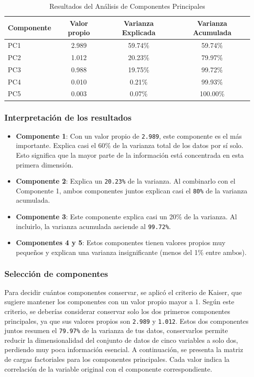 \documentclass[journal]{IEEEtran}
\begin{document}
	\begin{table}[H]
		\centering
		\caption{Resultados del Análisis de Componentes Principales}
		\begin{tabular}{l c c c}
			\toprule
			Componente & Valor propio & Varianza Explicada & Varianza Acumulada \\
			\midrule
			PC1 & 2.989 & 59.74\% & 59.74\% \\
			PC2 & 1.012 & 20.23\% & 79.97\% \\
			PC3 & 0.988 & 19.75\% & 99.72\% \\
			PC4 & 0.010 & 0.21\%  & 99.93\% \\
			PC5 & 0.003 & 0.07\% & 100.00\% \\
			\bottomrule
		\end{tabular}
		\label{tab:pca_results}
	\end{table}
	\subsubsection{Interpretación de los resultados}
	\begin{itemize}
		\item \textbf{Componente 1}: Con un valor propio de \texttt{2.989}, este componente es el más importante. Explica casi el 60\% de la varianza total de los datos por sí solo. Esto significa que la mayor parte de la información está concentrada en esta primera dimensión.
		\item \textbf{Componente 2}: Explica un \texttt{20.23\%} de la varianza. Al combinarlo con el Componente 1, ambos componentes juntos explican casi el \texttt{80\%} de la varianza acumulada.
		\item \textbf{Componente 3}: Este componente explica casi un 20\% de la varianza. Al incluirlo, la varianza acumulada asciende al \texttt{99.72\%}.
		\item \textbf{Componentes 4 y 5}: Estos componentes tienen valores propios muy pequeños y explican una varianza insignificante (menos del 1\% entre ambos).
	\end{itemize}
	\subsubsection{Selección de componentes}
	Para decidir cuántos componentes conservar, se aplicó el criterio de  Kaiser, que sugiere mantener los componentes con un valor propio mayor a 1.
	Según este criterio, se deberías considerar conservar solo los dos primeros componentes principales, ya que sus valores propios son \texttt{2.989} y \texttt{1.012}.
	Estos dos componentes juntos resumen el \texttt{79.97\%} de la varianza de tus datos, conservarlos permite reducir la dimensionalidad del conjunto de datos de cinco variables a solo dos, perdiendo muy poca información esencial.
	A continuación, se presenta la matriz de cargas factoriales para los componentes principales. Cada valor indica la correlación de la variable original con el componente correspondiente.
\end{document}
